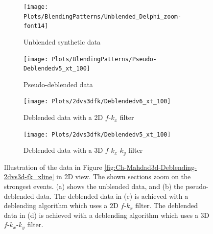  
\begin{figure}
	
	\centering
	\begin{subfigure}[t]{0.8\textwidth}
		\centering
		\texttt{[image: Plots/BlendingPatterns/Unblended\_Delphi\_zoom-font14]}
		\caption{Unblended synthetic data}
		\label{fig:Ch-Mahdad3d-Unbl-Delphi}
	\end{subfigure}

	\par\bigskip
	
	\centering
	\begin{subfigure}[t]{0.8\textwidth}
		\texttt{[image: Plots/BlendingPatterns/Pseudo-Deblendedv5\_xt\_100]}
		\caption{Pseudo-deblended data}
		\label{fig:Ch-Mahdad3d-Deblending-Pseudo-Zoom}
	\end{subfigure}
	
	\par\bigskip

	\centering
	\begin{subfigure}[t]{0.8\textwidth}
		\texttt{[image: Plots/2dvs3dfk/Deblendedv6\_xt\_100]}
		\caption{Deblended data with a 2D $f$-$k_x$ filter}
		\label{fig:Ch-Mahdad3d-Deblending-2dfk}
	\end{subfigure}
	
	\par\bigskip
	
	\centering
	\begin{subfigure}[t]{0.8\textwidth}
		\texttt{[image: Plots/2dvs3dfk/Deblendedv5\_xt\_100]}
		\caption{Deblended data with a 3D $f$-$k_x$-$k_y$ filter}
		\label{fig:Ch-Mahdad3d-Deblending-3dfk}
	\end{subfigure}
	
	\caption{Illustration of the data in Figure \ref{fig:Ch-Mahdad3d-Deblending-2dvs3d-fk_xline} in 2D view. The shown sections zoom on the strongest events. (a) shows the unblended data, and (b) the pseudo-deblended data. The deblended data in (c) is achieved with a deblending algorithm which uses a 2D $f$-$k_x$ filter. The deblended data in (d) is achieved with a deblending algorithm which uses a 3D $f$-$k_x$-$k_y$ filter.}
	\label{fig:Ch-Mahdad3d-Deblending-2dvs3d-fk}
	
\end{figure}


